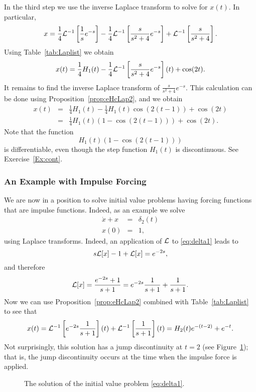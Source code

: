 \documentclass{ximera}
\begin{document}
In the third step we use the inverse Laplace transform to solve for $x(t)$. 
In particular,
\[
x = \frac{1}{4}{\cal L}^{-1}\left[\frac{1}{s}e^{-s}\right] - 
\frac{1}{4}{\cal L}^{-1}\left[\frac{s}{s^2+4}e^{-s}\right] + 
{\cal L}^{-1}\left[\frac{s}{s^2+4}\right].
\]
Using Table~\ref{tab:Laplist} we obtain
\[
x(t) = \frac{1}{4}H_1(t) - 
\frac{1}{4}{\cal L}^{-1}\left[\frac{s}{s^2+4}e^{-s}\right](t) + \cos(2t).
\]
It remains to find the inverse Laplace transform of $\frac{s}{s^2+4}e^{-s}$.  
This calculation can be done using Proposition~\ref{prop:eHcLap2}, and we 
obtain
\begin{eqnarray*}
x(t) & = & \frac{1}{4}H_1(t) - \frac{1}{4}H_1(t)\cos(2(t-1)) + \cos(2t) \\
& = & \frac{1}{4}H_1(t)(1-\cos(2(t-1))) + \cos(2t).
\end{eqnarray*}
Note that the function 
\[
H_1(t)(1-\cos(2(t-1)))
\]
is differentiable, even though the step function $H_1(t)$ is discontinuous.
See Exercise~\ref{Ex:cont}.

\subsubsection*{An Example with Impulse Forcing}

We are now in a position to solve initial value problems having forcing 
functions that are impulse functions.   Indeed, as an example we solve
\begin{equation}  \label{eq:delta1}
\begin{array}{rcl}
\dot x + x & = & \delta_2(t)\\
x(0) & = & 1,
\end{array}
\end{equation}
using Laplace transforms.  Indeed, an application of ${\cal L}$ to
\eqref{eq:delta1} leads to
\[
s{\cal L}[x]-1 + {\cal L}[x] = e^{-2s},
\]
and therefore
\[
{\cal L}[x]=\frac{e^{-2s}+1}{s+1}=e^{-2s}\frac{1}{s+1}+\frac{1}{s+1}.
\]
Now we can use Proposition~\ref{prop:eHcLap2} combined with 
Table~\ref{tab:Laplist} to see that
\[
x(t) = {\cal L}^{-1}\left[e^{-2s}\frac{1}{s+1}\right](t)+ 
{\cal L}^{-1}\left[\frac{1}{s+1}\right](t) = 
H_2(t)e^{-(t-2)} + e^{-t}.
\]
Not surprisingly, this solution has a jump discontinuity at $t=2$ (see 
Figure~\ref{fig:delta1sol}); that is, the jump discontinuity occurs at 
the time when the impulse force is applied.
\begin{figure}[htb]
           \centerline{%
           }
           \caption{The solution of the initial value problem
	   \protect\eqref{eq:delta1}.}
           \label{fig:delta1sol}
\end{figure}
\end{document}
